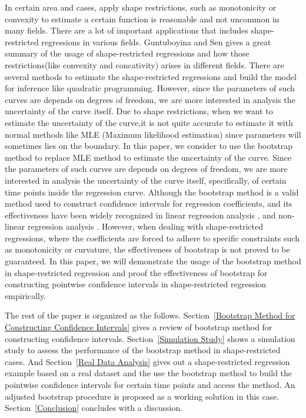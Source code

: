 \documentclass[12pt]{article}
\begin{document}
In certain area and cases, apply shape restrictions, such as monotonicity or convexity to estimate a certain function is reasonable and not uncommon in many fields.\cite{guo2019smooth} There are a lot of important applications that includes shape-restricted regressions in various fields.  Guntuboyina and Sen gives a great summary of the usage of shape-restricted regressions and how those restrictions(like convexity and concativity) arises in different fields.\cite{guntuboyina2018nonparametric} There are several methods to estimate the shape-restricted regressions and build the model for inference like quadratic programming.\cite{meyer2013simple} However, since the parameters of such curves are depends on degrees of freedom, we are more interested in analysis the uncertainty of the curve itself. Due to shape restrictions, when we want to estimate the uncertainty of the curve,it is not quite accurate to estimate it with normal methods like MLE (Maximum likelihood estimation) since parameters will sometimes lies on the boundary. In this paper, we consider to use the bootstrap method to replace MLE method to estimate the uncertainty of the curve. Since the parameters of such curves are depends on degrees of freedom, we are more interested in analysis the uncertainty of the curve itself, specifically, of certain time points inside the regression curve. Although the bootstrap method is a valid method used to construct confidence intervals for regression coefficients, \cite{efron1985bootstrap}and its effectiveness have been widely recognized in linear regression analysis \cite{efron1979bootstrap}, and non-linear regression analysis \cite{davidson1999bootstrap}. However, when dealing with shape-restricted regressions, where the coefficients are forced to adhere to specific constraints such as monotonicity or curvature, the effectiveness of bootstrap is not proved to be guaranteed. In this paper, we will demonstrate the usage of the bootstrap method in shape-restricted regression and proof the effectiveness of bootstrap for constructing pointwise confidence intervals in shape-restricted regression empirically. 

The rest of the paper is organized as the follows. Section~\ref{Bootstrap Method for Constructing Confidence Intervals} gives a review of bootstrap method for constructing confidence intervals. Section~\ref{Simulation Study} shows a simulation study to assess the performance of the bootstrap method in shape-restricted cases. And Section~\ref{Real Data Analysis} gives out a shape-restricted regression example based on a real dataset and the use the bootstrap method to build the pointwise confidence intervals for certain time points and access the method. An
adjusted bootstrap procedure is proposed as a working solution in this case.  
Section~\ref{Conclusion} concludes with a discussion.
\end{document}

